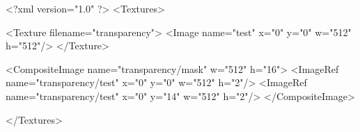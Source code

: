 <?xml version="1.0" ?>
<Textures>

	<Texture filename="transparency">
		<Image name="test" x="0" y="0" w="512" h="512"/>
	</Texture>

	<CompositeImage name="transparency/mask" w="512" h="16">
		<ImageRef name="transparency/test" x="0" y="0" w="512" h="2"/>
		<ImageRef name="transparency/test" x="0" y="14" w="512" h="2"/>
	</CompositeImage>
	
</Textures>
